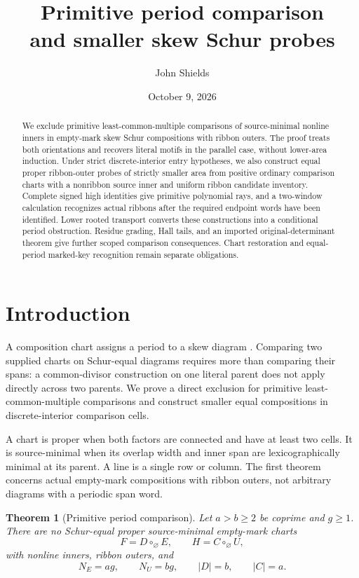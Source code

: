 \documentclass[11pt,a4paper]{amsart}
\title[Primitive period comparison and smaller skew Schur probes]{Primitive period comparison\\ and smaller skew Schur probes}
\author{John Shields}
\date{October 9, 2026}
\numberwithin{equation}{section}
\theoremstyle{plain}
\newtheorem{theorem}{Theorem}[section]
\theoremstyle{definition}
\begin{document}
\begin{abstract}
We exclude primitive least-common-multiple comparisons of source-minimal nonline inners in empty-mark skew Schur compositions with ribbon outers.  The proof treats both orientations and recovers literal motifs in the parallel case, without lower-area induction.  Under strict discrete-interior entry hypotheses, we also construct equal proper ribbon-outer probes of strictly smaller area from positive ordinary comparison charts with a nonribbon source inner and uniform ribbon candidate inventory.  Complete signed high identities give primitive polynomial rays, and a two-window calculation recognizes actual ribbons after the required endpoint words have been identified.  Lower rooted transport converts these constructions into a conditional period obstruction.  Residue grading, Hall tails, and an imported original-determinant theorem give further scoped comparison consequences.  Chart restoration and equal-period marked-key recognition remain separate obligations.
\end{abstract}
\maketitle
\section{Introduction}\label{sec:introduction}

A composition chart assigns a period to a skew diagram \cite{Shields2026CornerDescent}.  Comparing two supplied charts on Schur-equal diagrams requires more than comparing their spans: a common-divisor construction on one literal parent does not apply directly across two parents.  We prove a direct exclusion for primitive least-common-multiple comparisons and construct smaller equal compositions in discrete-interior comparison cells.

A chart is proper when both factors are connected and have at least two cells.  It is source-minimal when its overlap width and inner span are lexicographically minimal at its parent.  A line is a single row or column.  The first theorem concerns actual empty-mark compositions with ribbon outers, not arbitrary diagrams with a periodic span word.

\begin{theorem}[Primitive period comparison]\label{thm:primitive-lcm}
Let \(a>b\ge2\) be coprime and \(g\ge1\).  There are no Schur-equal proper source-minimal empty-mark charts
\[
 F=D\circ_\varnothing E,\qquad H=C\circ_\varnothing U,
\]
with nonline inners, ribbon outers, and
\[
 N_E=ag,\qquad N_U=bg,\qquad |D|=b,\qquad |C|=a.
\]
\end{theorem}
\end{document}
